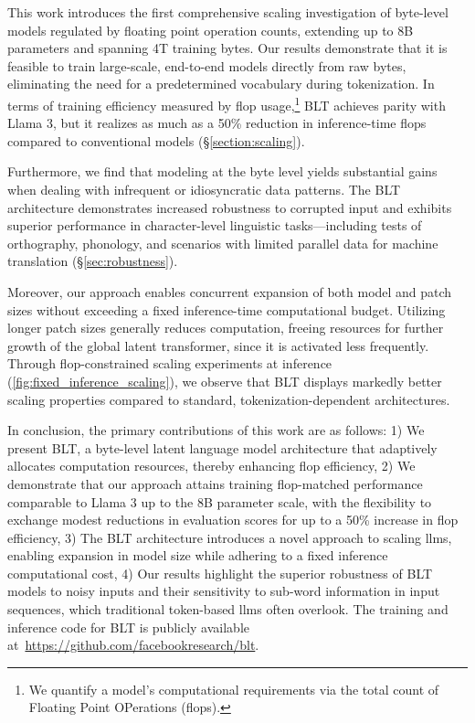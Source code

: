 This work introduces the first comprehensive scaling investigation of byte-level models regulated by floating point operation counts, extending up to 8B parameters and spanning 4T training bytes. Our results demonstrate that it is feasible to train large-scale, end-to-end models directly from raw bytes, eliminating the need for a predetermined vocabulary during tokenization. In terms of training efficiency measured by flop usage,\footnote{We quantify a model's computational requirements via the total count of Floating Point OPerations (flops).} {\textsc BLT} achieves parity with Llama 3, but it realizes as much as a 50\% reduction in inference-time flops compared to conventional models (\S\ref{section:scaling}). 

Furthermore, we find that modeling at the byte level yields substantial gains when dealing with infrequent or idiosyncratic data patterns. The {\textsc BLT} architecture demonstrates increased robustness to corrupted input and exhibits superior performance in character-level linguistic tasks—including tests of orthography, phonology, and scenarios with limited parallel data for machine translation (\S\ref{sec:robustness}).

Moreover, our approach enables concurrent expansion of both model and patch sizes without exceeding a fixed inference-time computational budget. Utilizing longer patch sizes generally reduces computation, freeing resources for further growth of the global latent transformer, since it is activated less frequently. Through flop-constrained scaling experiments at inference (\autoref{fig:fixed_inference_scaling}), we observe that {\textsc BLT} displays markedly better scaling properties compared to standard, tokenization-dependent architectures.

In conclusion, the primary contributions of this work are as follows: 1) We present {\textsc BLT}, a byte-level latent language model architecture that adaptively allocates computation resources, thereby enhancing flop efficiency, 2) We demonstrate that our approach attains training flop-matched performance comparable to Llama 3 up to the 8B parameter scale, with the flexibility to exchange modest reductions in evaluation scores for up to a 50\% increase in flop efficiency, 3) The {\textsc BLT} architecture introduces a novel approach to scaling llms, enabling expansion in model size while adhering to a fixed inference computational cost, 4) Our results highlight the superior robustness of {\textsc BLT} models to noisy inputs and their sensitivity to sub-word information in input sequences, which traditional token-based llms often overlook. The training and inference code for {\textsc BLT} is publicly available at~\url{https://github.com/facebookresearch/blt}.

